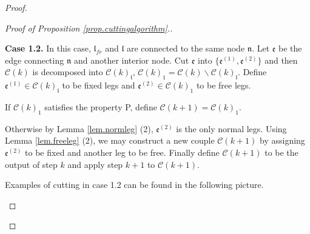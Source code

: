 \begin{proof}
\begin{proof}[Proof of Proposition \ref{prop.cuttingalgorithm}.]
\begin{mdframed}
\textbf{Case 1.2.} In this case, $\mathfrak{l}_{fr}$ and $\mathfrak{l}$ are connected to the same node $\mathfrak{n}$. Let $\mathfrak{e}$ be the edge connecting $\mathfrak{n}$ and another interior node. Cut $\mathfrak{e}$ into $\{\mathfrak{e}^{(1)},\mathfrak{e}^{(2)}\}$ and then $\mathcal{C}(k)$ is decomposed into $\mathcal{C}(k)_{\mathfrak{l}}$, $\mathcal{C}(k)_1=\mathcal{C}(k)\backslash \mathcal{C}(k)_{\mathfrak{l}}$. Define $\mathfrak{e}^{(1)}\in \mathcal{C}(k)_{\mathfrak{l}}$ to be fixed legs and $\mathfrak{e}^{(2)}\in \mathcal{C}(k)_1$ to be free legs. 

If $\mathcal{C}(k)_1$ satisfies the property P, define $\mathcal{C}(k+1)=\mathcal{C}(k)_1$.


Otherwise by Lemma \ref{lem.normleg} (2), %
$\mathfrak{e}^{(2)}$ is the only normal legs. Using Lemma \ref{lem.freeleg} (2), we may construct a new couple $\mathcal{C}(k+1)$ by assigning $\mathfrak{e}^{(2)}$ to be fixed and another leg to be free. 
Finally define $\mathcal{C}(k+1)$ to be the output of step $k$ and apply step $k+1$ to $\mathcal{C}(k+1)$. 

Examples of cutting in case 1.2 can be found in the following picture.
\begin{figure}[H]
    \centering
\end{figure}
\end{mdframed}
\end{proof}
\end{proof}
